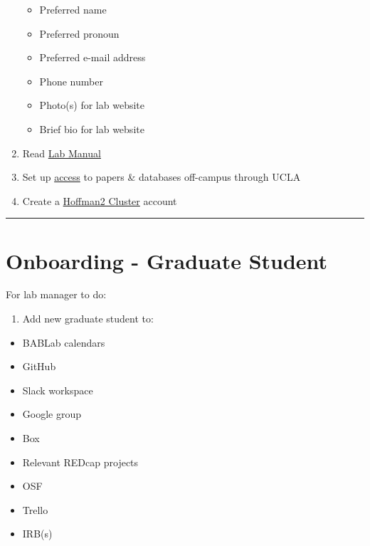\documentclass[
]{book}
\providecommand{\tightlist}{%
  \setlength{\itemsep}{0pt}\setlength{\parskip}{0pt}}
\begin{document}
\begin{enumerate}
  \begin{itemize}
  \tightlist
  \item
    Preferred name
  \item
    Preferred pronoun
  \item
    Preferred e-mail address
  \item
    Phone number
  \item
    Photo(s) for lab website
  \item
    Brief bio for lab website
  \end{itemize}
\item
  Read \href{https://bablab.github.io/lab_manual/}{Lab Manual}
\item
  Set up \href{https://www.library.ucla.edu/use/computers-computing-services/connect-campus}{access} to papers \& databases off-campus through UCLA
\item
  Create a \href{https://www.hoffman2.idre.ucla.edu/}{Hoffman2 Cluster} account
\end{enumerate}

\begin{center}\rule{0.5\linewidth}{0.5pt}\end{center}

\hypertarget{onboarding---graduate-student}{%
\section{Onboarding - Graduate Student}\label{onboarding---graduate-student}}

For lab manager to do:

\begin{enumerate}
\def\labelenumi{\arabic{enumi}.}
\tightlist
\item
  Add new graduate student to:
\end{enumerate}

\begin{itemize}
\tightlist
\item
  BABLab calendars
\item
  GitHub
\item
  Slack workspace
\item
  Google group
\item
  Box
\item
  Relevant REDcap projects
\item
  OSF
\item
  Trello
\item
  IRB(s)
\end{itemize}
\end{document}
